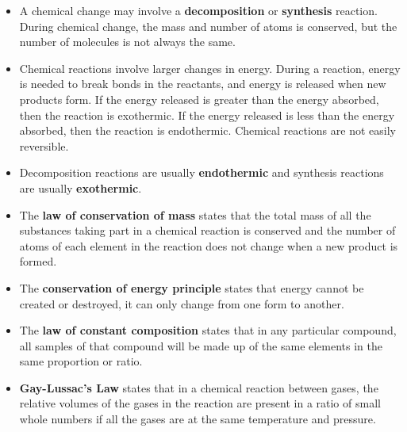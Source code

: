 \begin{itemize}
\item{A chemical change may involve a \textbf{decomposition} or \textbf{synthesis} reaction. During chemical change, the mass and number of atoms is conserved, but the number of molecules is not always the same.}
\item{Chemical reactions involve larger changes in energy. During a reaction, energy is needed to break bonds in the reactants, and energy is released when new products form. If the energy released is greater than the energy absorbed, then the reaction is exothermic. If the energy released is less than the energy absorbed, then the reaction is endothermic. Chemical reactions are not easily reversible.}
\item{Decomposition reactions are usually \textbf{endothermic} and synthesis reactions are usually \textbf{exothermic}.}
\item{The \textbf{law of conservation of mass} states that the total mass of all the substances taking part in a chemical reaction is conserved and the number of atoms of each element in the reaction does not change when a new product is formed.}
\item{The \textbf{conservation of energy principle} states that energy cannot be created or destroyed, it can only change from one form to another.}
\item{The \textbf{law of constant composition} states that in any particular compound, all samples of that compound will be made up of the same elements in the same proportion or ratio.}
\item{\textbf{Gay-Lussac's Law} states that in a chemical reaction between gases, the relative volumes of the gases in the reaction are present in a ratio of small whole numbers if all the gases are at the same temperature and pressure.} 
\end{itemize}

